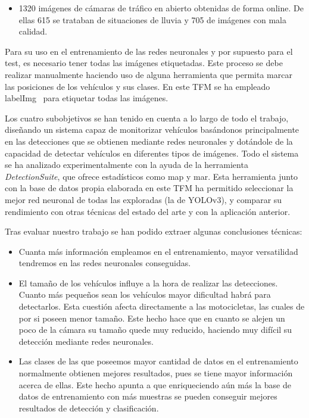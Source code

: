 \begin{itemize}
\begin{itemize}
        \item 1320 imágenes de cámaras de tráfico en abierto obtenidas de forma online. De ellas 615 se trataban de situaciones de lluvia y 705 de imágenes con mala calidad.
    \end{itemize} 
    Para su uso en el entrenamiento de las redes neuronales y por supuesto para el test, es necesario tener todas las imágenes etiquetadas. Este proceso se debe realizar manualmente haciendo uso de alguna herramienta que permita marcar las posiciones de los vehículos y sus clases. En este TFM se ha empleado labelImg~\cite{labelimg} para etiquetar todas las imágenes.
\end{itemize}

Los cuatro subobjetivos se han tenido en cuenta a lo largo de todo el trabajo, diseñando un sistema capaz de monitorizar vehículos basándonos principalmente en las detecciones que se obtienen mediante redes neuronales y dotándole de la capacidad de detectar vehículos en diferentes tipos de imágenes.
Todo el sistema se ha analizado experimentalmente con la ayuda de la herramienta \textit{DetectionSuite}, que ofrece estadísticos como \acrshort{map} y \acrshort{mar}. Esta herramienta junto con la base de datos propia elaborada en este TFM ha permitido seleccionar la mejor red neuronal de todas las exploradas (la de YOLOv3), y comparar su rendimiento con otras técnicas del estado del arte y con la aplicación anterior.

Tras evaluar nuestro trabajo se han podido extraer algunas conclusiones técnicas:
\begin{itemize}
    \item Cuanta más información empleamos en el entrenamiento, mayor versatilidad tendremos en las redes neuronales conseguidas.
    \item El tamaño de los vehículos influye a la hora de realizar las detecciones. Cuanto más pequeños sean los vehículos mayor dificultad habrá para detectarlos. Esta cuestión afecta directamente a las motocicletas, las cuales de por si poseen menor tamaño. Este hecho hace que en cuanto se alejen un poco de la cámara su tamaño quede muy reducido, haciendo muy difícil su detección mediante redes neuronales.
    \item Las clases de las que poseemos mayor cantidad de datos en el entrenamiento normalmente obtienen mejores resultados, pues se tiene mayor información acerca de ellas. Este hecho apunta a que enriqueciendo aún más la base de datos de entrenamiento con más muestras se pueden conseguir mejores resultados de detección y clasificación.
\end{itemize}



